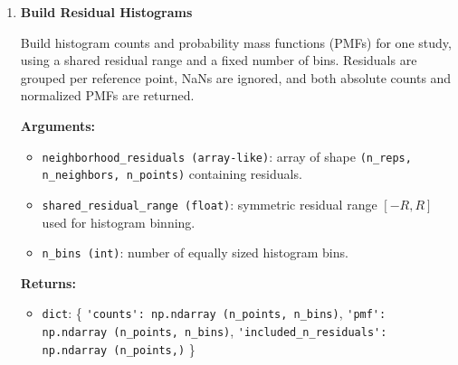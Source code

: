 \begin{enumerate}
        \textbf{Arguments:}
        \begin{itemize}
            \item \lstinline!neighborhood_residuals_S1 (array-like)!: array of shape \lstinline!(n_reps_S1, n_neighbors, n_points)!.
            \item \lstinline!neighborhood_residuals_S2 (array-like)!: array of shape \lstinline!(n_reps_S2, n_neighbors, n_points)!.
            \item \lstinline!residual_range_quantile (float)!: percentile used to determine the residual range (default \lstinline!95.0!).
        \end{itemize}

        \textbf{Returns:}
        \begin{itemize}
            \item \lstinline!float!: shared residual range \(R\)
        \end{itemize}

        \begin{lstlisting}[language=Python, caption={Shared Residual Range}]
R = tox_determine_shared_residual_range(
    neighborhood_residuals_S1,
    neighborhood_residuals_S2,
    residual_range_quantile=95.0
)
        \end{lstlisting}

    \item \textbf{Build Residual Histograms}

        Build histogram counts and probability mass functions (PMFs) for one study, using a shared residual range and a fixed number of bins.  
        Residuals are grouped per reference point, NaNs are ignored, and both absolute counts and normalized PMFs are returned.

        \textbf{Arguments:}
        \begin{itemize}
            \item \lstinline!neighborhood_residuals (array-like)!: array of shape \lstinline!(n_reps, n_neighbors, n_points)! containing residuals.
            \item \lstinline!shared_residual_range (float)!: symmetric residual range \([-R, R]\) used for histogram binning.
            \item \lstinline!n_bins (int)!: number of equally sized histogram bins.
        \end{itemize}

        \textbf{Returns:}
        \begin{itemize}
            \item \lstinline!dict!: \{
                \lstinline!'counts': np.ndarray (n_points, n_bins)!,  
                \lstinline!'pmf': np.ndarray (n_points, n_bins)!,  
                \lstinline!'included_n_residuals': np.ndarray (n_points,)!
            \}
        \end{itemize}


\end{enumerate}
